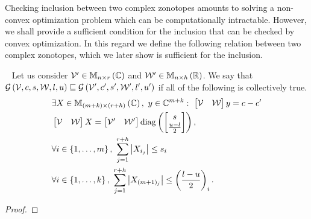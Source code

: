 Checking inclusion between two complex zonotopes amounts to
solving a non-convex optimization problem which can be computationally
intractable.  However, we shall provide a sufficient condition for
the inclusion that can be checked by convex optimization.  In
this regard we define the following relation between two complex
zonotopes, which we later show is sufficient for the inclusion.
%
\begin{definition}~\label{defn:inclusion}
Let us consider $\mathcal{V}^\prime\in\mathbb{M}_{n\times r}\left(\mathbb{C}\right)$ and
$\mathcal{W}^\prime\in\mathbb{M}_{n\times h}\left(\mathbb{R}\right)$.  We say that
$\mathcal{G}\left(\mathcal{V},c,s,\mathcal{W},l,u\right) \sqsubseteq \mathcal{G}\left(\mathcal{V}^\prime,c^\prime,s^\prime,\mathcal{W}^\prime,l^\prime,u^\prime\right)$
if all of the following is collectively true.
%
\begin{align*}
  & \exists X\in\mathbb{M}_{(m+k)\times(r+h)}\left(\mathbb{C}\right),~y\in\mathbb{C}^{m+k}:~\left[\begin{matrix}\mathcal{V} & \mathcal{W}\end{matrix}\right]{y} = c-c^\prime \\
  & \left[\begin{matrix}\mathcal{V} & \mathcal{W}\end{matrix}\right] X = \left[\begin{matrix}\mathcal{V}^\prime &
    \mathcal{W}^\prime\end{matrix}\right]\operatorname{diag}\left(\left[\begin{matrix}s
      \\ \frac{u-l}{2}\end{matrix}\right]\right),\\
  & \forall i\in\left\{1,\ldots,m\right\},~\sum_{j = 1}^{r+h}\left|X_{i_j}\right|
  \leq s_i\\
  & \forall i\in\left\{1,\ldots,k\right\},~\sum_{j =
    1}^{r+h}\left|X_{(m+1)_j}\right|\leq \left(\frac{l-u}{2}\right)_i.
\end{align*}
%
\end{definition}
%
\begin{proof}

\end{proof}
%
